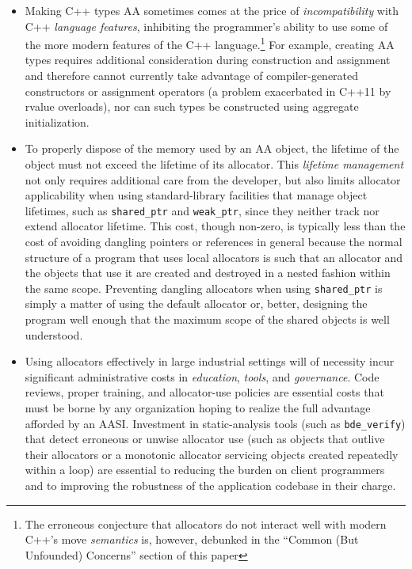 \begin{itemize}
\item Making C++ types AA sometimes comes at the price of \emph{incompatibility} with C++
\emph{language features}, inhibiting the programmer’s ability to use some of the more
modern features of the C++ language.\footnote{The erroneous conjecture that allocators
do not interact well with modern C++’s move \emph{semantics} is,
however, debunked in the “Common (But Unfounded) Concerns” section of this paper} For example, creating AA types
requires additional consideration during construction and assignment and
therefore cannot currently take advantage of compiler-generated constructors
or assignment operators (a problem exacerbated in C++11 by rvalue
overloads), nor can such types be constructed using aggregate initialization.

\item To properly dispose of the memory used by an AA object, the lifetime of the
object must not exceed the lifetime of its allocator. This \emph{lifetime management}
not only requires additional care from the developer, but also limits allocator
applicability when using standard-library facilities that manage object
lifetimes, such as \lstinline{shared_ptr} and \lstinline{weak_ptr}, since they neither track nor
extend allocator lifetime. This cost, though non-zero, is typically less than the
cost of avoiding dangling pointers or references in general because the normal
structure of a program that uses local allocators is such that an allocator and
the objects that use it are created and destroyed in a nested fashion within
the same scope. Preventing dangling allocators when using \lstinline{shared_ptr} is
simply a matter of using the default allocator or, better, designing the program
well enough that the maximum scope of the shared objects is well understood.

\item Using allocators effectively in large industrial settings will of necessity incur
significant administrative costs in \emph{education}, \emph{tools}, and \emph{governance}. Code
reviews, proper training, and allocator-use policies are essential costs that
must be borne by any organization hoping to realize the full advantage
afforded by an AASI. Investment in static-analysis tools (such as \lstinline{bde_verify})
that detect erroneous or unwise allocator use (such as objects that outlive
their allocators or a monotonic allocator servicing objects created repeatedly
within a loop) are essential to reducing the burden on client programmers and
to improving the robustness of the application codebase in their charge.

\end{itemize}

